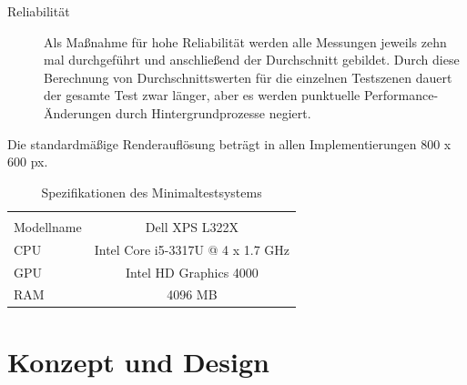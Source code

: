 \begin{description}
\item[Reliabilität] Als Maßnahme für hohe Reliabilität werden alle Messungen jeweils zehn mal durchgeführt und anschließend der Durchschnitt gebildet. Durch diese Berechnung von Durchschnittswerten für die einzelnen Testszenen dauert der gesamte Test zwar länger, aber es werden punktuelle Performance-Änderungen durch Hintergrundprozesse negiert. \\
\end{description}
Die standardmäßige Renderauflösung beträgt in allen Implementierungen 800 x 600 px.

\begin{table}
    \begin{tabular}{ | l | c |}
    \hline \\
    Modellname & Dell XPS L322X \\ \hline
    CPU & Intel Core i5-3317U @ 4 x 1.7 GHz \\ \hline
    GPU & Intel HD Graphics 4000 \\ \hline
    RAM & 4096 MB \\ \hline
    \end{tabular}
    \caption{Spezifikationen des Minimaltestsystems}
   	\label{tab:specs}
\end{table}

\chapter{Konzept und Design}


